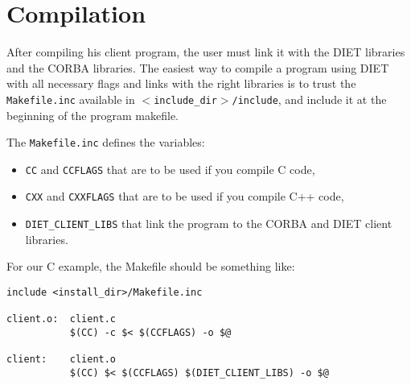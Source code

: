 \section{Compilation}
\label{sec:cl_comp}

After compiling his client program, the user must link it with the DIET
libraries and the CORBA libraries. The easiest way to compile a program using
DIET with all necessary flags and links with the right libraries is to trust the
\texttt{Makefile.inc} available in \texttt{$<$include\_dir$>$/include}, and
include it at the beginning of the program makefile.

The \texttt{Makefile.inc} defines the variables:
\begin{itemize}
\item \texttt{CC} and \texttt{CCFLAGS} that are to be used if you compile C
 code,
\item \texttt{CXX} and \texttt{CXXFLAGS} that are to be used if you compile C++
  code,
\item \texttt{DIET\_CLIENT\_LIBS} that link the program to the CORBA and DIET
  client libraries.
\end{itemize}

For our C example, the Makefile should be something like:
{\footnotesize
\begin{verbatim}
include <install_dir>/Makefile.inc

client.o:  client.c
           $(CC) -c $< $(CCFLAGS) -o $@

client:    client.o
           $(CC) $< $(CCFLAGS) $(DIET_CLIENT_LIBS) -o $@
\end{verbatim}
}

